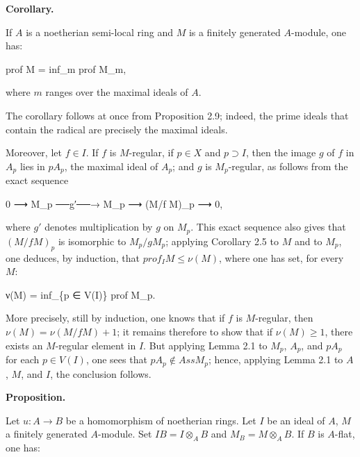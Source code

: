 \documentclass[
  11pt,
  a4paper,
]{book}
\newenvironment{Shaded}{}{}
\newcommand{\NormalTok}[1]{#1}
\begin{document}
\textbf{Corollary.}

If \(A\) is a noetherian semi-local ring and \(M\) is a finitely
generated \(A\)-module, one has:

\begin{Shaded}
\begin{Highlighting}[]
\NormalTok{prof M = inf\_m prof M\_m,}
\end{Highlighting}
\end{Shaded}

where \(m\) ranges over the maximal ideals of \(A\).

The corollary follows at once from Proposition 2.9; indeed, the prime
ideals that contain the radical are precisely the maximal ideals.

Moreover, let \(f \in I\). If \(f\) is \(M\)-regular, if \(p \in X\) and
\(p \supset I\), then the image \(g\) of \(f\) in \(A_{p}\) lies in
\(pA_{p}\), the maximal ideal of \(A_{p}\); and \(g\) is
\(M_{p}\)-regular, as follows from the exact sequence

\begin{Shaded}
\begin{Highlighting}[]
\NormalTok{0 ⟶ M\_p ──g′──→ M\_p ⟶ (M/f M)\_p ⟶ 0,}
\end{Highlighting}
\end{Shaded}

where \(g'\) denotes multiplication by \(g\) on \(M_{p}\). This exact
sequence also gives that \((M/f M)_{p}\) is isomorphic to
\(M_{p}/gM_{p}\); applying Corollary 2.5 to \(M\) and to \(M_{p}\), one
deduces, by induction, that \(prof_{I} M \leqslant
\nu(M)\), where one has set, for every \(M\):

\begin{Shaded}
\begin{Highlighting}[]
\NormalTok{ν(M) = inf\_\{p ∈ V(I)\} prof M\_p.}
\end{Highlighting}
\end{Shaded}

More precisely, still by induction, one knows that if \(f\) is
\(M\)-regular, then \(\nu(M) = \nu(M/f M) + 1\); it remains therefore to
show that if \(\nu(M) \geqslant 1\), there exists an \(M\)-regular
element in \(I\). But applying Lemma 2.1 to \(M_{p}\), \(A_{p}\), and
\(pA_{p}\) for each \(p \in V(I)\), one sees that
\(pA_{p} \notin Ass M_{p}\); hence, applying Lemma 2.1 to \(A\), \(M\),
and \(I\), the conclusion follows.

\textbf{Proposition.}

Let \(u: A \to B\) be a homomorphism of noetherian rings. Let \(I\) be
an ideal of \(A\), \(M\) a finitely generated \(A\)-module. Set
\(IB = I \otimes_{A} B\) and \(M_{B} = M \otimes_{A} B\). If \(B\) is
\(A\)-flat, one has:
\end{document}
